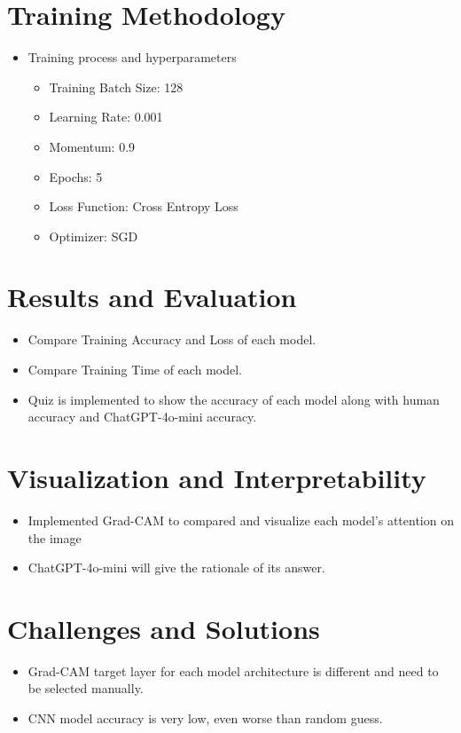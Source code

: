 \documentclass{article}
\begin{document}
\section{Training Methodology}
\begin{itemize}
    \item Training process and hyperparameters
    \begin{itemize}
        \item Training Batch Size: 128
        \item Learning Rate: 0.001
        \item Momentum: 0.9
        \item Epochs: 5
        \item Loss Function: Cross Entropy Loss
        \item Optimizer: SGD
    \end{itemize}
\end{itemize}

\section{Results and Evaluation}
\begin{itemize}
    \item Compare Training Accuracy and Loss of each model.
    \item Compare Training Time of each model.
    \item Quiz is implemented to show the accuracy of each model along with human accuracy and ChatGPT-4o-mini accuracy.
\end{itemize}

\section{Visualization and Interpretability}
\begin{itemize}
    \item Implemented Grad-CAM to compared and visualize each model's attention on the image
    \item ChatGPT-4o-mini will give the rationale of its answer.
\end{itemize}

\section{Challenges and Solutions}
\begin{itemize}
    \item Grad-CAM target layer for each model architecture is different and need to be selected manually.
    \item CNN model accuracy is very low, even worse than random guess.
\end{itemize}
\end{document}
